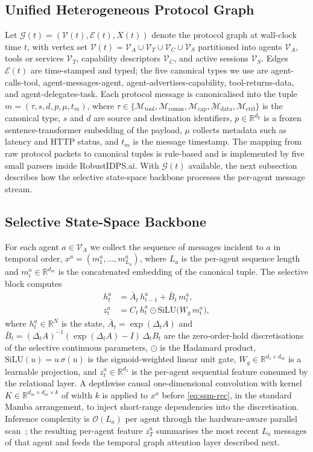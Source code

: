 \documentclass[journal,10pt,twocolumn]{IEEEtran}
\newcommand{\R}{\mathbb{R}}
\newcommand{\calG}{\mathcal{G}}
\newcommand{\calM}{\mathcal{M}}
\newcommand{\calO}{\mathcal{O}}
\newcommand{\calV}{\mathcal{V}}
\newcommand{\calE}{\mathcal{E}}
\begin{document}
\subsection{Unified Heterogeneous Protocol Graph}
\label{sec:graph}
Let $\calG(t)=(\calV(t),\calE(t),X(t))$ denote the protocol graph at wall-clock time $t$, with vertex set $\calV(t)=\calV_{A}\cup\calV_{T}\cup\calV_{C}\cup\calV_{S}$ partitioned into agents $\calV_{A}$, tools or services $\calV_{T}$, capability descriptors $\calV_{C}$, and active sessions $\calV_{S}$. Edges $\calE(t)$ are time-stamped and typed; the five canonical types we use are agent-calls-tool, agent-messages-agent, agent-advertises-capability, tool-returns-data, and agent-delegates-task. Each protocol message is canonicalised into the tuple $m=(\tau,s,d,p,\mu,t_{m})$, where $\tau\in\{\calM_{\text{tool}},\calM_{\text{comm}},\calM_{\text{cap}},\calM_{\text{data}},\calM_{\text{ctrl}}\}$ is the canonical type, $s$ and $d$ are source and destination identifiers, $p\in\R^{d_{p}}$ is a frozen sentence-transformer embedding of the payload, $\mu$ collects metadata such as latency and HTTP status, and $t_{m}$ is the message timestamp. The mapping from raw protocol packets to canonical tuples is rule-based and is implemented by five small parsers inside RobustIDPS.ai. With $\calG(t)$ available, the next subsection describes how the selective state-space backbone processes the per-agent message stream.

\subsection{Selective State-Space Backbone}
\label{sec:backbone}
For each agent $a\in\calV_{A}$ we collect the sequence of messages incident to $a$ in temporal order, $x^{a}=(m^{a}_{1},\ldots,m^{a}_{L_{a}})$, where $L_{a}$ is the per-agent sequence length and $m^{a}_{i}\in\R^{d_{m}}$ is the concatenated embedding of the canonical tuple. The selective block computes
\begin{align}
h^{a}_{t} &= \bar A_{t}\,h^{a}_{t-1} + \bar B_{t}\,m^{a}_{t}, \label{eq:ssm-rec}\\
z^{a}_{t} &= C_{t}\,h^{a}_{t} \odot \mathrm{SiLU}\bigl(W_{g}\,m^{a}_{t}\bigr), \label{eq:gate}
\end{align}
where $h^{a}_{t}\in\R^{N}$ is the state, $\bar A_{t}=\exp(\Delta_{t}A)$ and $\bar B_{t}=(\Delta_{t}A)^{-1}(\exp(\Delta_{t}A)-I)\,\Delta_{t}B_{t}$ are the zero-order-hold discretisations of the selective continuous parameters, $\odot$ is the Hadamard product, $\mathrm{SiLU}(u)=u\,\sigma(u)$ is the sigmoid-weighted linear unit gate, $W_{g}\in\R^{d_{z}\times d_{m}}$ is a learnable projection, and $z^{a}_{t}\in\R^{d_{z}}$ is the per-agent sequential feature consumed by the relational layer. A depthwise causal one-dimensional convolution with kernel $K\in\R^{d_{m}\times d_{m}\times k}$ of width $k$ is applied to $x^{a}$ before \eqref{eq:ssm-rec}, in the standard Mamba arrangement, to inject short-range dependencies into the discretisation. Inference complexity is $\calO(L_{a})$ per agent through the hardware-aware parallel scan~\cite{Gu2023Mamba}; the resulting per-agent feature $z^{a}_{T}$ summarises the most recent $L_{a}$ messages of that agent and feeds the temporal graph attention layer described next.
\end{document}
